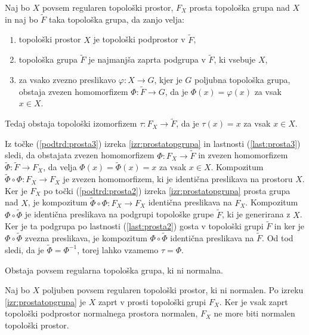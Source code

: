 \documentclass[mat1]{fmfdelo}
\begin{document}
\begin{izrek}\label{izr:prostaizo}
Naj bo $X$ povsem regularen topološki prostor, $F_X$ prosta topološka grupa nad $X$ in naj bo $\widetilde{F}$ taka topološka grupa, da zanjo velja:
\begin{enumerate}
	\item topološki prostor $X$ je topološki podprostor v $\widetilde{F}$,\label{last:prosta1}
	\item topološka grupa $\widetilde{F}$ je najmanjša zaprta podgrupa v $\widetilde{F}$, ki vsebuje $X$,\label{last:prosta2}
	\item za vsako zvezno preslikavo $\varphi\colon X \to G$, kjer je $G$ poljubna topološka grupa, obstaja zvezen homomorfizem $\Phi\colon \widetilde{F} \to G$, da je $\Phi(x) = \varphi(x)$ za vsak $x \in X$.\label{last:prosta3}
\end{enumerate}
Tedaj obstaja topološki izomorfizem $\tau\colon F_X \to \widetilde{F}$, da je $\tau(x) = x$ za vsak $x \in X$.
\end{izrek}

\begin{dokaz}
Iz točke (\ref{podtrd:prosta3}) izreka \ref{izr:prostatopgrupa} in lastnosti (\ref{last:prosta3}) sledi, da obstajata zvezen homomorfizem $\Phi\colon F_X \to \widetilde{F}$ in zvezen homomorfizem $\widetilde{\Phi}\colon \widetilde{F} \to F_X$, da velja $\Phi(x) = \widetilde{\Phi}(x) = x$ za vsak $x \in X$. Kompozitum $\widetilde{\Phi}\circ\Phi\colon F_X \to F_X$ je zvezen homomorfizem, ki je identična preslikava na prostoru $X$. Ker je $F_X$ po točki (\ref{podtrd:prosta2}) izreka \ref{izr:prostatopgrupa} prosta grupa nad $X$, je kompozitum $\widetilde{\Phi}\circ\Phi\colon F_X \to F_X$ identična preslikava na $F_X$. Kompozitum $\Phi\circ\widetilde{\Phi}$ je identična preslikava na podgrupi topološke grupe $\widetilde{F}$, ki je generirana z $X$. Ker je ta podgrupa po lastnosti (\ref{last:prosta2}) gosta v topološki grupi $\widetilde{F}$ in ker je $\Phi\circ\widetilde{\Phi}$ zvezna preslikava, je kompozitum $\Phi\circ\widetilde{\Phi}$ identična preslikava na $\widetilde{F}$. Od tod sledi, da je $\widetilde{\Phi} = \Phi^{-1}$, torej lahko vzamemo $\tau = \Phi$.
\end{dokaz}

\begin{izrek}
Obstaja povsem regularna topološka grupa, ki ni normalna.
\end{izrek}

\begin{dokaz}
Naj bo $X$ poljuben povsem regularen topološki prostor, ki ni normalen. Po izreku \ref{izr:prostatopgrupa} je $X$ zaprt v prosti topološki grupi $F_X$. Ker je vsak zaprt topološki podprostor normalnega prostora normalen, $F_X$ ne more biti normalen topološki prostor.
\end{dokaz}
\end{document}
